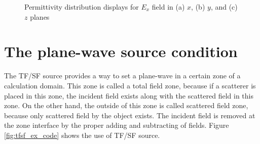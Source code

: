 \begin{figure}[hp!]
  \begin{center}
  \end{center}
  \caption{Permittivity distribution displays for $E_x$ field in (a) $x$, (b) $y$, and (c) $z$ planes}
  \label{fig:man_perm_view}
\end{figure}

\section{The plane-wave source condition}
The TF/SF source provides a way to set a plane-wave in a certain zone of a calculation domain. This zone is called a total field zone, because if a scatterer is placed in this zone, the incident field exists along with the scattered field in this zone. On the other hand, the outside of this zone is called scattered field zone, because only scattered field by the object exists. The incident field is removed at the zone interface by the proper adding and subtracting of fields. Figure \ref{fig:tfsf_ex_code} shows the use of TF/SF source.


